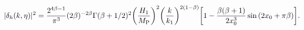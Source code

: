 \begin{equation}
|\delta_{h}(k,\eta)|^2 = \frac{2^{4 \beta -1}}{ \pi^3  } ( 2 \beta )^{ - 2 \beta}
\Gamma(\beta + 1/2)^2 
\biggl(\frac{H_1}{M_{\rm P}}\biggr)^2   
\biggl(\frac{k}{k_1}\biggr)^{2(1 - \beta)}\biggl[ 1 - 
\frac{  \beta (\beta+1)}{2 x_0^3} \sin{( 2 x_0 + \pi\beta)}
\biggr].
\label{ps3}
\end{equation}

